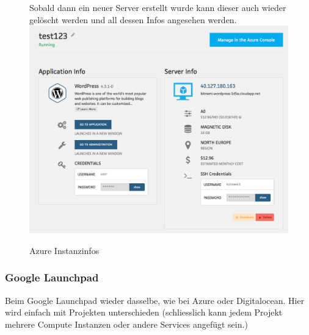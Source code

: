 \begin{figure}[!htbp]
Sobald dann ein neuer Server erstellt wurde kann dieser auch wieder gelöscht 
werden und all dessen Infos angesehen werden.\\
\includegraphics[width=\textwidth]{./03_Analyse/03_Bitnami/images/azure_instanceinfos}
\caption{Azure Instanzinfos}
\end{figure}

\newpage

\subsubsection{Google Launchpad\autocite{google}}

Beim Google Launchpad wieder dasselbe, wie bei Azure oder Digitalocean.
Hier wird einfach mit Projekten unterschieden (schliesslich kann jedem Projekt mehrere Compute Instanzen 
oder andere Services angefügt sein.)

